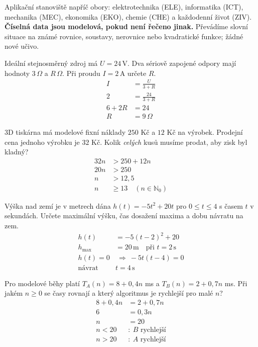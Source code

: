 \documentclass[11pt,a4paper]{article}
\begin{document}
Aplikační stanoviště napříč obory: elektrotechnika (ELE), informatika (ICT), mechanika (MEC), ekonomika (EKO), chemie (CHE) a každodenní život (ZIV). \textbf{Číselná data jsou modelová, pokud není řečeno jinak.} Převádíme slovní situace na známé rovnice, soustavy, nerovnice nebo kvadratické funkce; žádné nové učivo.
\begin{prikladReseniBox}[title={Příklad 1}]
Ideální stejnosměrný zdroj má $U=24\,\mathrm V$. Dva sériově zapojené odpory mají hodnoty $3\,\Omega$ a $R\,\Omega$. Při proudu $I=2\,\mathrm A$ určete $R$.
\tcblower
\[
\begin{aligned}
I&=\frac{U}{3+R}\\
2&=\frac{24}{3+R}\\
6+2R&=24\\
R&=9\,\Omega
\end{aligned}
\]

\end{prikladReseniBox}
\begin{prikladReseniBox}[title={Příklad 2}]
3D tiskárna má modelové fixní náklady $250$ Kč a $12$ Kč na výrobek. Prodejní cena jednoho výrobku je $32$ Kč. Kolik \emph{celých} kusů musíme prodat, aby zisk byl kladný?
\tcblower
\[
\begin{aligned}
32n&>250+12n\\
20n&>250\\
n&>12{,}5\\
n&\ge13\quad(n\in\mathbb N_0)
\end{aligned}
\]

\end{prikladReseniBox}
\begin{prikladReseniBox}[title={Příklad 3}]
Výška nad zemí je v metrech dána $h(t)=-5t^2+20t$ pro $0\le t\le4$ s časem $t$ v sekundách. Určete maximální výšku, čas dosažení maxima a dobu návratu na zem.
\tcblower
\[
\begin{aligned}
h(t)&=-5(t-2)^2+20\\
h_{\max}&=20\,\mathrm m\quad\text{při }t=2\,\mathrm s\\
h(t)=0&\ \Rightarrow\ -5t(t-4)=0\\
\text{návrat }&t=4\,\mathrm s
\end{aligned}
\]

\end{prikladReseniBox}
\begin{prikladReseniBox}[title={Příklad 4}]
Pro modelové běhy platí $T_A(n)=8+0{,}4n$ ms a $T_B(n)=2+0{,}7n$ ms. Při jakém $n\ge0$ se časy rovnají a který algoritmus je rychlejší pro malé $n$?
\tcblower
\[
\begin{aligned}
8+0{,}4n&=2+0{,}7n\\
6&=0{,}3n\\
n&=20\\
n<20&:\ B\text{ rychlejší}\\
n>20&:\ A\text{ rychlejší}
\end{aligned}
\]

\end{prikladReseniBox}
\end{document}
